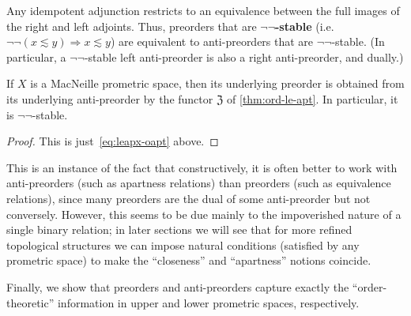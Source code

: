 \documentclass{article}
\def\leapx{\lesssim}
\let\implies\Rightarrow
\def\neigh{\mathfrak{Z}}
\def\nn{\ensuremath{\neg\neg}}
\begin{document}
Any idempotent adjunction restricts to an equivalence between the full images of the right and left adjoints.
Thus, preorders that are \textbf{\nn-stable} (i.e.\ $\neg\neg(x\leapx y) \implies x\leapx y$) are equivalent to anti-preorders that are \nn-stable.
(In particular, a \nn-stable left anti-preorder is also a right anti-preorder, and dually.)

\begin{thm}\label{thm:macneille-preord}
  If $X$ is a MacNeille prometric space, then its underlying preorder is obtained from its underlying anti-preorder by the functor $\neigh$ of \cref{thm:ord-le-apt}.
  In particular, it is \nn-stable.
\end{thm}
\begin{proof}
  This is just~\eqref{eq:leapx-oapt} above.
\end{proof}

This is an instance of the fact that constructively, it is often better to work with anti-preorders (such as apartness relations) than preorders (such as equivalence relations), since many preorders are the dual of some anti-preorder but not conversely.
However, this seems to be due mainly to the impoverished nature of a single binary relation; in later sections we will see that for more refined topological structures we can impose natural conditions (satisfied by any prometric space) to make the ``closeness'' and ``apartness'' notions coincide.

Finally, we show that preorders and anti-preorders capture exactly the ``order-theoretic'' information in upper and lower prometric spaces, respectively.
\end{document}
